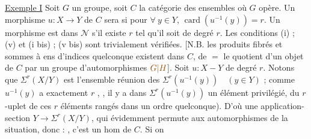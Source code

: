 \uline{Exemple I} Soit $G$ un groupe, soit $C$ la catégorie des ensembles où $G$ opère. Un morphisme $u:X\longrightarrow Y$ de $C$ sera    si pour $\forall\ y\in Y$,   $\operatorname{card}(u^{-1}(y))=r$. Un morphisme est dans $\mathcal N$ s'il existe $r$ tel qu'il soit de degré $r$. Les conditions (i) ; (v) et (i bis) ; (v bis) sont trivialement vérifiées. [N.B. les produits fibrés et sommes à ens d'indices quelconque existent dans $C$,  de $=$ le quotient d'un objet de $C$ par un groupe d'automorphismes $\unsure{G|H}$]. Soit $u:X-Y$ de degré $r$. Notons que $\Sigma^r(X/Y)$ est l'ensemble   réunion des $\Sigma^r(u^{-1}(y))\quad(y\in Y)$ ; comme $u^{-1}(y)$ a exactement $r$ , ,  il y a dans $\Sigma^r(u^{-1}(y))$ un élément privilégié,  du $r$-uplet  de ces $r$ éléments rangés dans un ordre quelconque). D'où une application-section $Y\longrightarrow\Sigma^r(X/Y)$, qui évidemment permute aux automorphismes de la situation, donc : ,   c'est un  hom de $C$. Si on

